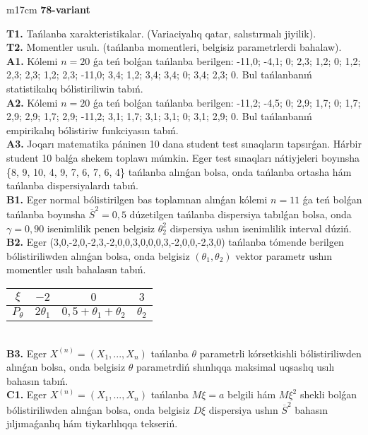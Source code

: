 \documentclass{article}
\begin{document}
\begin{tabular}{m{17cm}}
\textbf{78-variant}
\newline

\textbf{T1.} 
Tańlanba xarakteristikalar. (Variaciyalıq qatar, salıstırmalı jiyilik).
 \\
\textbf{T2.} 
Momentler usulı. (tańlanba momentleri, belgisiz parametrlerdi bahalaw).
 \\
\textbf{A1.} 
Kólemi \(n = 20\) ǵa teń bolǵan tańlanba berilgen: -11,0; -4,1; 0; 2,3; 1,2; 0; 1,2; 2,3; 2,3; 1,2; 2,3; -11,0; 3,4; 1,2; 3,4; 3,4; 0; 3,4; 2,3; 0. Bul tańlanbanıń statistikalıq bólistiriliwin tabıń.
 \\
\textbf{A2.} 
Kólemi \(n = 20\) ǵa teń bolǵan tańlanba berilgen: -11,2; -4,5; 0; 2,9; 1,7; 0; 1,7; 2,9; 2,9; 1,7; 2,9; -11,2; 3,1; 1,7; 3,1; 3,1; 0; 3,1; 2,9; 0. Bul tańlanbanıń empirikalıq bólistiriw funkciyasın tabıń.
 \\
\textbf{A3.} 
Joqarı matematika páninen 10 dana student test sınaqların tapsırǵan. Hárbir student 10 balǵa shekem toplawı múmkin. Eger test sınaqları nátiyjeleri boyınsha \{8, 9, 10, 4, 9, 7, 6, 7, 6, 4\} tańlanba alınǵan bolsa, onda tańlanba ortasha hám tańlanba dispersiyalardı tabıń.
 \\
\textbf{B1.} 
Eger normal bólistirilgen bas toplamnan alınǵan kólemi \(n = 11\) ǵa teń bolǵan tańlanba boyınsha \({\overline{S}}^{2} = 0,5\) dúzetilgen tańlanba dispersiya tabılǵan bolsa, onda \(\gamma = 0,90\) isenimlilik penen belgisiz \(\theta_{2}^{2}\) dispersiya ushın isenimlilik interval dúziń.
 \\
\textbf{B2.} 
Eger (3,0,-2,0,-2,3,-2,0,0,3,0,0,0,3,-2,0,0,-2,3,0) tańlanba tómende berilgen bólistiriliwden alınǵan bolsa, onda belgisiz \(\left( \theta_{1},\theta_{2} \right)\) vektor parametr ushın momentler usılı bahalasın tabıń.
\begin{tabular}{|c|c|c|c|}
  \hline
$\xi$ &
$- 2$ &
$0$ &
$3$\\
\hline
\(P_{\theta}\) & \({2\theta}_{1}\) & \(0,5 + \theta_{1} + \theta_{2}\) & \(\theta_{2}\) \\
\hline
\end{tabular}
 \\
\textbf{B3.} 
Eger \(X^{(n)} = \left( X_{1},...,X_{n} \right)\) tańlanba \(\theta\) parametrli kórsetkishli bólistiriliwden alınǵan bolsa, onda belgisiz \(\theta\) parametrdiń shınlıqqa maksimal uqsaslıq usılı bahasın tabıń.
 \\
\textbf{C1.} 
Eger \(X^{(n)} = \left( X_{1},...,X_{n} \right)\) tańlanba \(M\xi = a\) belgili hám \(M\xi^{2}\) shekli bolǵan bólistiriliwden alınǵan bolsa, onda belgisiz \(D\xi\) dispersiya ushın \({\overline{S}}^{2}\) bahasın jıljımaǵanlıq hám tiykarlılıqqa tekseriń.

\end{tabular}
\end{document}
